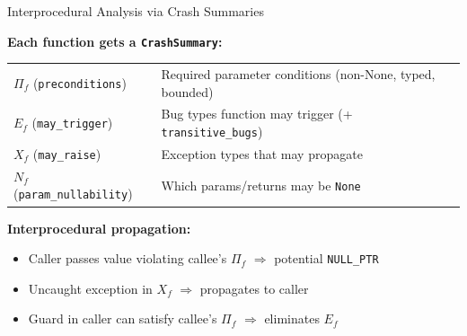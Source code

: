 \documentclass[aspectratio=169]{beamer}
\begin{document}
\begin{frame}{Interprocedural Analysis via Crash Summaries}

\textbf{Each function gets a \texttt{CrashSummary}:}

\begin{tabular}{ll}
  $\Pi_f$ (\texttt{preconditions})  & Required parameter conditions (non-None, typed, bounded) \\
  $E_f$ (\texttt{may\_trigger})     & Bug types function may trigger (+ \texttt{transitive\_bugs}) \\
  $X_f$ (\texttt{may\_raise})       & Exception types that may propagate \\
  $N_f$ (\texttt{param\_nullability}) & Which params/returns may be \texttt{None} \\
\end{tabular}

\vspace{0.5em}
\textbf{Interprocedural propagation:}
\begin{itemize}
  \item Caller passes value violating callee's $\Pi_f$ $\Rightarrow$ potential \texttt{NULL\_PTR}
  \item Uncaught exception in $X_f$ $\Rightarrow$ propagates to caller
  \item Guard in caller can satisfy callee's $\Pi_f$ $\Rightarrow$ eliminates $E_f$
\end{itemize}

\end{frame}
\end{document}
